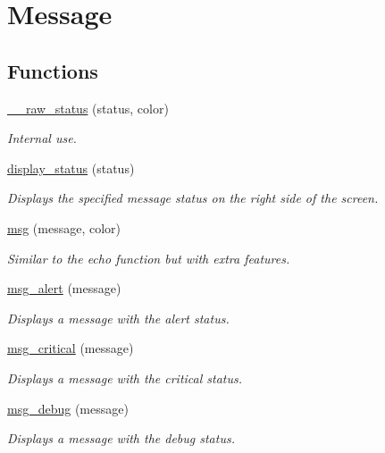 \hypertarget{group__message}{}\section{Message}
\label{group__message}
\subsection*{Functions}
\begin{DoxyCompactItemize}
\item 
\hyperlink{group__message_gab8cefae01bd7be88bdefd3f719682cc2}{\+\_\+\+\_\+raw\+\_\+status} (status, color)
\begin{DoxyCompactList}\small\item\em Internal use. \end{DoxyCompactList}\item 
\hyperlink{group__message_ga96f4577ff4b52262f9a0caa7385a354b}{display\+\_\+status} (status)
\begin{DoxyCompactList}\small\item\em Displays the specified message status on the right side of the screen. \end{DoxyCompactList}\item 
\hyperlink{group__message_ga0a802cfb26922315f8503676672fcea9}{msg} (message, color)
\begin{DoxyCompactList}\small\item\em Similar to the \textquotesingle{}echo\textquotesingle{} function but with extra features. \end{DoxyCompactList}\item 
\hyperlink{group__message_ga0b542f8978d859a6f0bd30de6791df41}{msg\+\_\+alert} (message)
\begin{DoxyCompactList}\small\item\em Displays a message with the \textquotesingle{}alert\textquotesingle{} status. \end{DoxyCompactList}\item 
\hyperlink{group__message_ga4f7002e0dcd96055ba404a5dd0ad34b1}{msg\+\_\+critical} (message)
\begin{DoxyCompactList}\small\item\em Displays a message with the \textquotesingle{}critical\textquotesingle{} status. \end{DoxyCompactList}\item 
\hyperlink{group__message_ga6a2070c37510d23ac294b0c007dde078}{msg\+\_\+debug} (message)
\begin{DoxyCompactList}\small\item\em Displays a message with the \textquotesingle{}debug\textquotesingle{} status. \end{DoxyCompactList}\item 

\end{DoxyCompactItemize}
